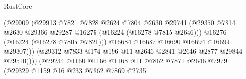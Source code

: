 \begin{lexlean}{RustCore}
\begin{coremodule}
                                              (@29909
                                                (@29913
                                                  @7821
                                                  @7828
                                                  @2624
                                                  @7804
                                                  @2630
                                                  @29741
                                                  (@29360
                                                    @7814
                                                    @2630
                                                    @29366
                                                    @29287
                                                    @16276
                                                    (@16224 (@16278 @7815 @2646)))
                                                  @16276
                                                  (@16224 (@16278 @7805 @7821)))
                                                @16684
                                                @16687
                                                @16690
                                                @16694
                                                @16699
                                                @29307)))
                                          (@29312
                                            @7833
                                            @174
                                            @196
                                            @11
                                            @2646
                                            @2841
                                            @2646
                                            @2877
                                            @29844
                                            @29510))))
                                    (@29234
                                      @1160
                                      @1166
                                      @1168
                                      @11
                                      @7862
                                      @7871
                                      @2646
                                      @7979
                                      (@29329
                                        @1159
                                        @16
                                        @233
                                        @7862
                                        @7869
                                        @2735

\end{coremodule}
\end{lexlean}
